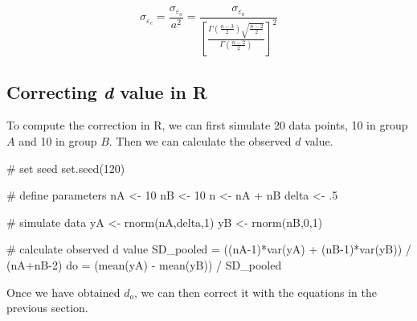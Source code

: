 \documentclass[
  letterpaper,
  DIV=11,
  numbers=noendperiod]{scrreprt}
\newenvironment{Shaded}{\begin{snugshade}}{\end{snugshade}}
\newcommand{\CommentTok}[1]{\textcolor[rgb]{0.37,0.37,0.37}{#1}}
\newcommand{\DecValTok}[1]{\textcolor[rgb]{0.68,0.00,0.00}{#1}}
\newcommand{\FunctionTok}[1]{\textcolor[rgb]{0.28,0.35,0.67}{#1}}
\newcommand{\NormalTok}[1]{\textcolor[rgb]{0.00,0.23,0.31}{#1}}
\newcommand{\OtherTok}[1]{\textcolor[rgb]{0.00,0.23,0.31}{#1}}
\newcommand{\SpecialCharTok}[1]{\textcolor[rgb]{0.37,0.37,0.37}{#1}}
\begin{document}
\[
\sigma_{\varepsilon_c} = \frac{\sigma_{\varepsilon_o}}{a^2} =\frac{\sigma_{\varepsilon_o}}{\left[\frac{\Gamma\left(\frac{n-3}{2}\right)\sqrt{\frac{n-2}{2}}}{\Gamma\left(\frac{n-2}{2}\right)}\right]^2}
\]

\hypertarget{correcting-d-value-in-r}{%
\subsection{\texorpdfstring{Correcting \emph{d} value in
R}{Correcting d value in R}}\label{correcting-d-value-in-r}}

To compute the correction in R, we can first simulate 20 data points, 10
in group \(A\) and 10 in group \(B\). Then we can calculate the observed
\(d\) value.

\begin{Shaded}
\begin{Highlighting}[]
\CommentTok{\# set seed}
\FunctionTok{set.seed}\NormalTok{(}\DecValTok{120}\NormalTok{)}

\CommentTok{\# define parameters}
\NormalTok{nA }\OtherTok{\textless{}{-}} \DecValTok{10}
\NormalTok{nB }\OtherTok{\textless{}{-}} \DecValTok{10}
\NormalTok{n }\OtherTok{\textless{}{-}}\NormalTok{ nA }\SpecialCharTok{+}\NormalTok{ nB}
\NormalTok{delta }\OtherTok{\textless{}{-}}\NormalTok{ .}\DecValTok{5}

\CommentTok{\# simulate data}
\NormalTok{yA }\OtherTok{\textless{}{-}} \FunctionTok{rnorm}\NormalTok{(nA,delta,}\DecValTok{1}\NormalTok{)}
\NormalTok{yB }\OtherTok{\textless{}{-}} \FunctionTok{rnorm}\NormalTok{(nB,}\DecValTok{0}\NormalTok{,}\DecValTok{1}\NormalTok{)}

\CommentTok{\# calculate observed d value}
\NormalTok{SD\_pooled }\OtherTok{=}\NormalTok{ ((nA}\DecValTok{{-}1}\NormalTok{)}\SpecialCharTok{*}\FunctionTok{var}\NormalTok{(yA) }\SpecialCharTok{+}\NormalTok{ (nB}\DecValTok{{-}1}\NormalTok{)}\SpecialCharTok{*}\FunctionTok{var}\NormalTok{(yB)) }\SpecialCharTok{/}\NormalTok{ (nA}\SpecialCharTok{+}\NormalTok{nB}\DecValTok{{-}2}\NormalTok{)}
\NormalTok{do }\OtherTok{=}\NormalTok{ (}\FunctionTok{mean}\NormalTok{(yA) }\SpecialCharTok{{-}} \FunctionTok{mean}\NormalTok{(yB)) }\SpecialCharTok{/}\NormalTok{ SD\_pooled}
\end{Highlighting}
\end{Shaded}

Once we have obtained \(d_o\), we can then correct it with the equations
in the previous section.
\end{document}
